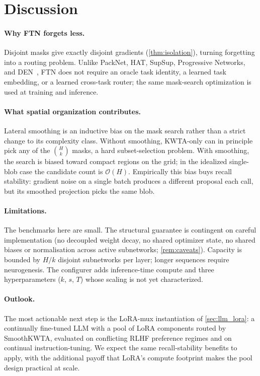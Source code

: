 \documentclass{article}
\theoremstyle{plain}
\theoremstyle{remark}
\begin{document}
\section{Discussion}

\paragraph{Why FTN forgets less.}
Disjoint masks give exactly disjoint gradients (\cref{thm:isolation}), turning forgetting into a routing problem. Unlike PackNet, HAT, SupSup, Progressive Networks, and DEN~\citep{mallya2018packnet,serra2018overcoming,wortsman2020supermasks,rusu2016progressive,yoon2018lifelong}, FTN does not require an oracle task identity, a learned task embedding, or a learned cross-task router; the same mask-search optimization is used at training and inference.

\paragraph{What spatial organization contributes.}
Lateral smoothing is an inductive bias on the mask search rather than a strict change to its complexity class. Without smoothing, KWTA-only can in principle pick any of the $\binom{H}{k}$ masks, a hard subset-selection problem. With smoothing, the search is biased toward compact regions on the grid; in the idealized single-blob case the candidate count is $\mathcal{O}(H)$. Empirically this bias buys recall stability: gradient noise on a single batch produces a different proposal each call, but its smoothed projection picks the same blob.

\paragraph{Limitations.}
The benchmarks here are small. The structural guarantee is contingent on careful implementation (no decoupled weight decay, no shared optimizer state, no shared biases or normalisation across active subnetworks; \cref{rem:caveats}). Capacity is bounded by $H/k$ disjoint subnetworks per layer; longer sequences require neurogenesis. The configurer adds inference-time compute and three hyperparameters ($k$, $s$, $T$) whose scaling is not yet characterized.

\paragraph{Outlook.}
The most actionable next step is the LoRA-mux instantiation of \cref{sec:llm_lora}: a continually fine-tuned LLM with a pool of LoRA components routed by SmoothKWTA, evaluated on conflicting RLHF preference regimes and on continual instruction-tuning. We expect the same recall-stability benefits to apply, with the additional payoff that LoRA's compute footprint makes the pool design practical at scale.
\end{document}
